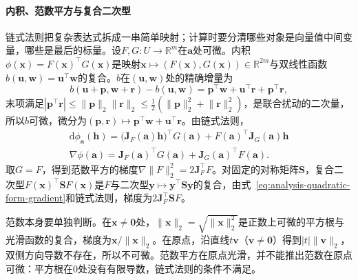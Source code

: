 \paragraph{内积、范数平方与复合二次型}
链式法则把复杂表达式拆成一串简单映射；计算时要分清哪些对象是向量值中间变量，哪些是最后的标量。设$F,G:U\to\mathbb R^m$在$\bm a$处可微。内积$\phi(\bm x)=F(\bm x)^\top G(\bm x)$是映射$\bm x\mapsto(F(\bm x),G(\bm x))\in\mathbb R^{2m}$与双线性函数$b(\bm u,\bm w)=\bm u^\top\bm w$的复合。$b$在$(\bm u,\bm w)$处的精确增量为
\[
 b(\bm u+\bm p,\bm w+\bm r)-b(\bm u,\bm w)=\bm p^\top\bm w+\bm u^\top\bm r+\bm p^\top\bm r,
\]
末项满足$|\bm p^\top\bm r|\leq\lVert\bm p\rVert_2\lVert\bm r\rVert_2\leq\tfrac12(\lVert\bm p\rVert_2^2+\lVert\bm r\rVert_2^2)$，是联合扰动的二次量，所以$b$可微，微分为$(\bm p,\bm r)\mapsto\bm p^\top\bm w+\bm u^\top\bm r$。由链式法则，
\[
 \begin{gathered}
 \mathrm d\phi_{\bm a}(\bm h)=\bigl(\bm J_F(\bm a)\bm h\bigr)^\top G(\bm a)+F(\bm a)^\top\bm J_G(\bm a)\bm h\\
 \nabla\phi(\bm a)=\bm J_F(\bm a)^\top G(\bm a)+\bm J_G(\bm a)^\top F(\bm a).
 \end{gathered}
\]
取$G=F$，得到范数平方的梯度$\nabla\lVert F\rVert_2^2=2\bm J_F^\top F$。对固定的对称矩阵$\bm S$，复合二次型$F(\bm x)^\top\bm SF(\bm x)$是$F$与二次型$\bm y\mapsto\bm y^\top\bm S\bm y$的复合，由式~\eqref{eq:analysis-quadratic-form-gradient}和链式法则，梯度为$2\bm J_F^\top\bm SF$。

范数本身要单独判断。在$\bm x\neq\bm0$处，$\lVert\bm x\rVert_2=\sqrt{\lVert\bm x\rVert_2^2}$是正数上可微的平方根与光滑函数的复合，梯度为$\bm x/\lVert\bm x\rVert_2$。在原点，沿直线$t\bm v$（$\bm v\neq\bm0$）得到$|t|\lVert\bm v\rVert_2$，双侧方向导数不存在，所以不可微。范数平方在原点光滑，并不能推出范数在原点可微：平方根在$0$处没有有限导数，链式法则的条件不满足。

